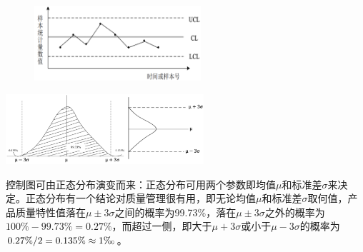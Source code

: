 \begin{figure}[H]
    \vspace{-0.5em}
	\centering
	\includegraphics[width=0.55\textwidth]{images/控制图.png}
    \vspace{-1em}
\end{figure}

\begin{table}
    \centering
    \vspace{-1.5em}
    \includegraphics[width=0.55\textwidth]{images/正态分布.png}
    \vspace{-2.5em}
\end{table}
控制图可由正态分布演变而来：正态分布可用两个参数即均值$\mu$和标准差$\sigma$来决定。正态分布有一个结论对质量管理很有用，即无论均值$\mu$和标准差$\sigma$取何值，产品质量特性值落在$\mu \pm 3\sigma$之间的概率为99.73\%，落在$\mu \pm 3\sigma$之外的概率为$100\% - 99.73\% = 0.27\%$，而超过一侧，即大于$\mu + 3\sigma$或小于$\mu - 3\sigma$的概率为$0.27\%/2=0.135\% \approx 1\text{\textperthousand}$。

